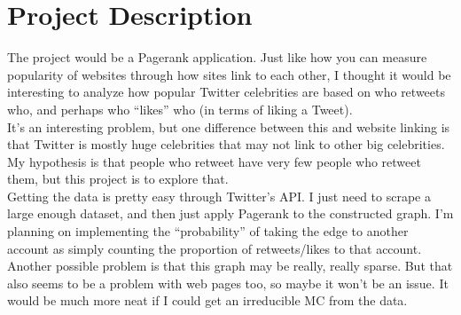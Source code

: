 
\usepackage{amsmath, dsfont, hyperref, xcolor}

\oddsidemargin 0in
\evensidemargin 0in
\textwidth 6.5in
\topmargin -0.5in
\textheight 9.0in
\newcommand{\norm}[1]{\left\lVert #1 \right\rVert}
\newcommand{\?}{\stackrel{?}{=}}

\usepackage{graphicx}



\pagestyle{myheadings}
\section{Project Description}
The project would be a Pagerank application. Just like how you can measure popularity of websites through how sites link to each other, I thought it would be interesting to analyze how popular Twitter celebrities are based on who retweets who, and perhaps who ``likes'' who (in terms of liking a Tweet).\\

It's an interesting problem, but one difference between this and website linking is that Twitter is mostly huge celebrities that may not link to other big celebrities. My hypothesis is that people who retweet have very few people who retweet them, but this project is to explore that.\\

Getting the data is pretty easy through Twitter's API. I just need to scrape a large enough dataset, and then just apply Pagerank to the constructed graph. I'm planning on implementing the ``probability'' of taking the edge to another account as simply counting the proportion of retweets/likes to that account. Another possible problem is that this graph may be really, really sparse. But that also seems to be a problem with web pages too, so maybe it won't be an issue. It would be much more neat if I could get an irreducible MC from the data.\\

